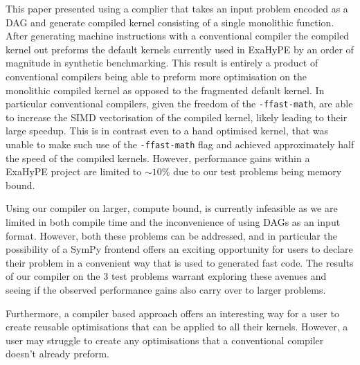 This paper presented using a complier that takes an input problem encoded as a DAG and generate compiled kernel consisting of a single monolithic function.
After generating machine instructions with a conventional compiler the compiled kernel out preforms the default kernels currently used in ExaHyPE by an order of magnitude in synthetic benchmarking.
This result is entirely a product of conventional compilers being able to preform more optimisation on the monolithic compiled kernel as opposed to the fragmented default kernel.
In particular conventional compilers, given the freedom of the \texttt{-ffast-math}, are able to increase the SIMD vectorisation of the compiled kernel, likely leading to their large speedup.
This is in contrast even to a hand optimised kernel, that was unable to make such use of the \texttt{-ffast-math} flag and achieved approximately half the speed of the compiled kernels.
However, performance gains within a ExaHyPE project are limited to $\sim 10\%$ due to our test problems being memory bound.

Using our compiler on larger, compute bound, is currently infeasible as we are limited in both compile time and the inconvenience of using DAGs as an input format.
However, both these problems can be addressed, and in particular the possibility of a SymPy frontend offers an exciting opportunity for users to declare their problem in a convenient way that is used to generated fast code. 
The results of our compiler on the 3 test problems warrant exploring these avenues and seeing if the observed performance gains also carry over to larger problems.

Furthermore, a compiler based approach offers an interesting way for a user to create reusable optimisations that can be applied to all their kernels.
However, a user may struggle to create any optimisations that a conventional compiler doesn't already preform.


